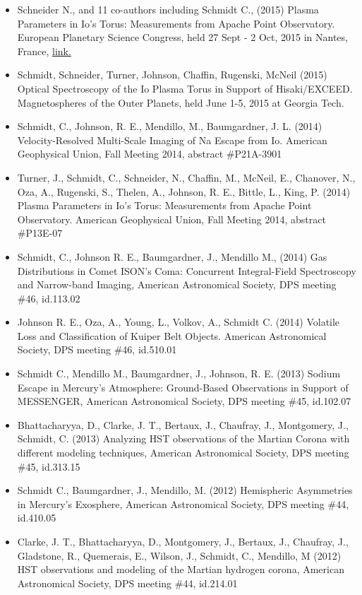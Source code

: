\documentclass[12pt]{report}
\begin{document}
\begin{itemize}
   \item Schneider N., and 11 co-authors including Schmidt C., (2015) Plasma Parameters in Io's Torus: Measurements from Apache Point Observatory. European Planetary Science Congress, held 27 Sept - 2 Oct, 2015 in Nantes, France, \href{https://meetingorganizer.copernicus.org/EPSC2015/EPSC2015-418-1.pdf}{link.} 
   \item Schmidt, Schneider, Turner, Johnson, Chaffin, Rugenski, McNeil (2015) Optical Spectroscopy of the Io Plasma Torus in Support of Hisaki/EXCEED. Magnetospheres of the Outer Planets, held June 1-5, 2015 at Georgia Tech.
   \item Schmidt, C., Johnson, R. E., Mendillo, M., Baumgardner, J. L. (2014) Velocity-Resolved Multi-Scale Imaging of Na Escape from Io. American Geophysical Union, Fall Meeting 2014, abstract \#P21A-3901
   \item Turner, J., Schmidt, C., Schneider, N., Chaffin, M., McNeil, E., Chanover, N., Oza, A., Rugenski, S., Thelen, A., Johnson, R. E., Bittle, L., King, P. (2014) Plasma Parameters in Io's Torus: Measurements from Apache Point Observatory. American Geophysical Union, Fall Meeting 2014, abstract \#P13E-07
   \item Schmidt, C., Johnson R. E., Baumgardner, J., Mendillo M., (2014) Gas Distributions in Comet ISON's Coma: Concurrent Integral-Field Spectroscopy and Narrow-band Imaging, American Astronomical Society, DPS meeting \#46, id.113.02
   \item Johnson R. E., Oza, A., Young, L., Volkov, A., Schmidt C. (2014) Volatile Loss and Classification of Kuiper Belt Objects. American Astronomical Society, DPS meeting \#46, id.510.01
   \item Schmidt C.,  Mendillo M., Baumgardner, J., Johnson, R. E. (2013) Sodium Escape in Mercury's Atmosphere: Ground-Based Observations in Support of MESSENGER, American Astronomical Society, DPS meeting \#45, id.102.07
   \item Bhattacharyya, D., Clarke, J. T., Bertaux, J., Chaufray, J., Montgomery, J., Schmidt, C. (2013) Analyzing HST observations of the Martian Corona with different modeling techniques, American Astronomical Society, DPS meeting \#45, id.313.15
   \item Schmidt C., Baumgardner, J., Mendillo, M. (2012) Hemispheric Asymmetries in Mercury's Exosphere, American Astronomical Society, DPS meeting \#44, id.410.05
   \item Clarke, J. T., Bhattacharyya, D., Montgomery, J., Bertaux, J., Chaufray, J., Gladstone, R., Quemerais, E., Wilson, J., Schmidt, C., Mendillo, M (2012) HST observations and modeling of the Martian hydrogen corona, American Astronomical Society, DPS meeting \#44, id.214.01

\end{itemize}
\end{document}
